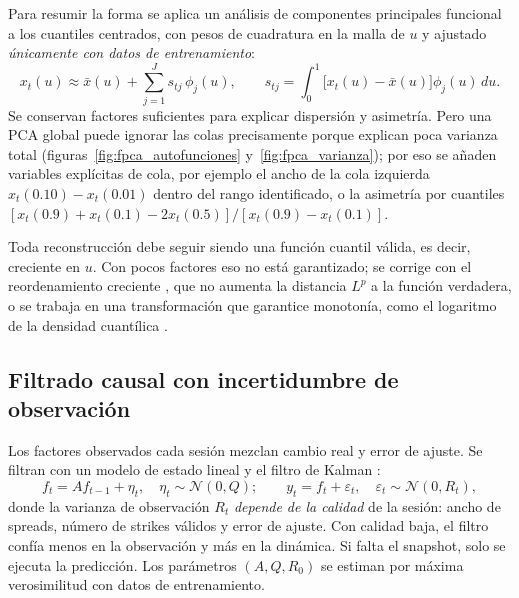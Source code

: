 Para resumir la forma se aplica un análisis de componentes principales funcional a los cuantiles
centrados, con pesos de cuadratura en la malla de $u$ y ajustado \emph{únicamente con datos de
entrenamiento}:
\begin{equation}
x_t(u)\approx\bar x(u)+\sum_{j=1}^{J}s_{tj}\,\phi_j(u),\qquad
s_{tj}=\int_0^1\bigl[x_t(u)-\bar x(u)\bigr]\phi_j(u)\,du .
\label{eq:fpca}
\end{equation}
Se conservan factores suficientes para explicar dispersión y asimetría. Pero una PCA global puede ignorar
las colas precisamente porque explican poca varianza total (figuras~\ref{fig:fpca_autofunciones}
y~\ref{fig:fpca_varianza}); por eso se añaden variables explícitas de cola, por ejemplo el ancho de la cola
izquierda $x_t(0.10)-x_t(0.01)$ dentro del rango identificado, o la asimetría por cuantiles
$[x_t(0.9)+x_t(0.1)-2x_t(0.5)]/[x_t(0.9)-x_t(0.1)]$.



Toda reconstrucción debe seguir siendo una función cuantil válida, es decir, creciente en $u$. Con pocos
factores eso no está garantizado; se corrige con el reordenamiento creciente \citep{chernozhukov2010}, que
no aumenta la distancia $L^p$ a la función verdadera, o se trabaja en una transformación que garantice
monotonía, como el logaritmo de la densidad cuantílica \citep{petersen2016}.

\subsection{Filtrado causal con incertidumbre de observación}\label{sec:kalman}

Los factores observados cada sesión mezclan cambio real y error de ajuste. Se filtran con un modelo de
estado lineal y el filtro de Kalman \citep{kalman1960}:
\begin{equation}
f_t=A f_{t-1}+\eta_t,\quad \eta_t\sim\mathcal N(0,Q);\qquad
y_t=f_t+\varepsilon_t,\quad \varepsilon_t\sim\mathcal N(0,R_t),
\label{eq:kalman}
\end{equation}
donde la varianza de observación $R_t$ \emph{depende de la calidad} de la sesión: ancho de spreads, número
de strikes válidos y error de ajuste. Con calidad baja, el filtro confía menos en la observación y más en
la dinámica. Si falta el snapshot, solo se ejecuta la predicción. Los parámetros $(A,Q,R_0)$ se estiman
por máxima verosimilitud con datos de entrenamiento.

